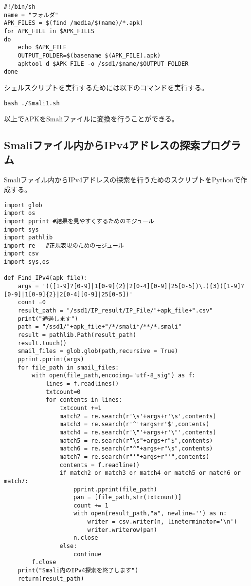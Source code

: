 \documentclass[a4j]{jarticle}
\begin{document}
\begin{lstlisting}[caption=APKからSmaliファイルの変換を行うシェルスクリプト]
#!/bin/sh
name = "フォルダ"
APK_FILES = $(find /media/$(name)/*.apk)
for APK_FILE in $APK_FILES
do
	echo $APK_FILE
	OUTPUT_FOLDER=$(basename $(APK_FILE).apk)
	apktool d $APK_FILE -o /ssd1/$name/$OUTPUT_FOLDER
done
\end{lstlisting}
シェルスクリプトを実行するためには以下のコマンドを実行する。
\begin{lstlisting}[caption=シェルスクリプトの実行方法]
bash ./Smali1.sh　
\end{lstlisting}
以上でAPKをSmaliファイルに変換を行うことができる。

\subsection{Smaliファイル内からIPv4アドレスの探索プログラム}
Smaliファイル内からIPv4アドレスの探索を行うためのスクリプトをPythonで作成する。
\begin{lstlisting}[caption=Smaliファイル内からIPv4アドレスの探索を行うためのPythonスクリプト]
import glob
import os
import pprint #結果を見やすくするためのモジュール
import sys
import pathlib
import re   #正規表現のためのモジュール
import csv
import sys,os

def Find_IPv4(apk_file):
	args = '(([1-9]?[0-9]|1[0-9]{2}|2[0-4][0-9]|25[0-5])\.){3}([1-9]?[0-9]|1[0-9]{2}|2[0-4][0-9]|25[0-5])'
	count =0
	result_path = "/ssd1/IP_result/IP_File/"+apk_file+".csv"
	print("通過します")
	path = "/ssd1/"+apk_file+"/*/smali*/**/*.smali"
	result = pathlib.Path(result_path)
	result.touch()
	smail_files = glob.glob(path,recursive = True)
	pprint.pprint(args)
	for file_path in smail_files:
		with open(file_path,encoding="utf-8_sig") as f:
			lines = f.readlines()
			txtcount=0
			for contents in lines:
				txtcount +=1
				match2 = re.search(r'\s'+args+r'\s',contents)
				match3 = re.search(r'^'+args+r'$',contents)
				match4 = re.search(r'\"'+args+r'\"',contents)
				match5 = re.search(r"\s"+args+r"$",contents)
				match6 = re.search(r"^"+args+r"\s",contents)
				match7 = re.search(r"'"+args+r"'",contents)
				contents = f.readline()
				if match2 or match3 or match4 or match5 or match6 or match7:
					pprint.pprint(file_path)
					pan = [file_path,str(txtcount)]
					count += 1
					with open(result_path,"a", newline='') as n:
						writer = csv.writer(n, lineterminator='\n')
						writer.writerow(pan)
					n.close
				else:
					continue
		f.close
	print("Smali内のIPv4探索を終了します")
	return(result_path)
		
\end{lstlisting}
\end{document}
